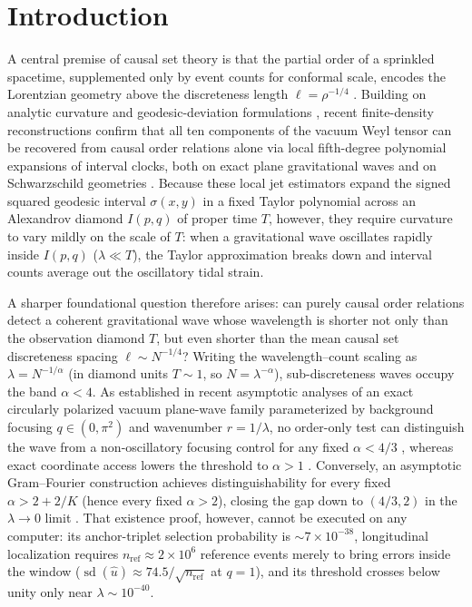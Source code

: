 \documentclass[11pt,a4paper]{article}
\begin{document}
\section{Introduction}
A central premise of causal set theory is that the partial order of a
sprinkled spacetime, supplemented only by event counts for conformal scale,
encodes the Lorentzian geometry above the discreteness length
$\ell = \rho^{-1/4}$ \cite{zeeman,hkm,malament,blms,surya}. Building on analytic
curvature and geodesic-deviation formulations \cite{madsen,ib}, recent
finite-density reconstructions confirm that all ten components of the vacuum
Weyl tensor can be recovered from causal order relations alone via local
fifth-degree polynomial expansions of interval clocks, both on exact plane
gravitational waves and on Schwarzschild geometries \cite{weylnote}. Because these local jet
estimators expand the signed squared geodesic interval $\sigma(x,y)$ in a
fixed Taylor polynomial across an Alexandrov diamond $I(p,q)$ of proper time
$T$, however, they require curvature to vary mildly on the scale of $T$: when a
gravitational wave oscillates rapidly inside $I(p,q)$ ($\lambda \ll T$), the
Taylor approximation breaks down and interval counts average out the oscillatory
tidal strain.

A sharper foundational question therefore arises: can purely causal order
relations detect a coherent gravitational wave whose wavelength is shorter not
only than the observation diamond $T$, but even shorter than the mean causal
set discreteness spacing $\ell \sim N^{-1/4}$? Writing the wavelength--count
scaling as $\lambda = N^{-1/\alpha}$ (in diamond units $T \sim 1$, so
$N = \lambda^{-\alpha}$), sub-discreteness waves occupy the band $\alpha < 4$.
As established in recent asymptotic analyses of an exact circularly polarized
vacuum plane-wave family parameterized by background focusing $q \in (0,\pi^2)$
and wavenumber $r = 1/\lambda$, no order-only test can distinguish the wave
from a non-oscillatory focusing control for any fixed $\alpha < 4/3$
\cite{weylnote,quantizedbound}, whereas exact coordinate access lowers the
threshold to $\alpha > 1$ \cite{oraclebarrier}. Conversely, an asymptotic
Gram--Fourier construction achieves distinguishability for every fixed
$\alpha > 2 + 2/K$ (hence every fixed $\alpha > 2$), closing the gap down to
$(4/3, 2)$ in the $\lambda \to 0$ limit \cite{gramfourier}. That existence proof,
however, cannot be executed on any computer: its anchor-triplet selection
probability is $\sim 7\times 10^{-38}$, longitudinal localization requires
$n_{\text{ref}} \approx 2\times 10^6$ reference events merely to bring errors
inside the window ($\operatorname{sd}(\hat{u}) \approx 74.5/\sqrt{n_{\text{ref}}}$
at $q=1$), and its threshold crosses below unity only near $\lambda \sim 10^{-40}$.
\end{document}
